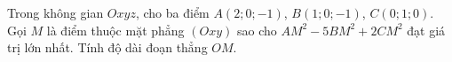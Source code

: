 \begin{ex}
Trong không gian $Oxyz$, cho ba điểm $A(2;0;-1)$, $B(1;0;-1)$, $C(0;1;0)$. Gọi $M$ là điểm thuộc mặt phẳng $(Oxy)$ sao cho $AM^2-5BM^2+2CM^2$ đạt giá trị lớn nhất. Tính độ dài đoạn thẳng $OM$.
\end{ex}
